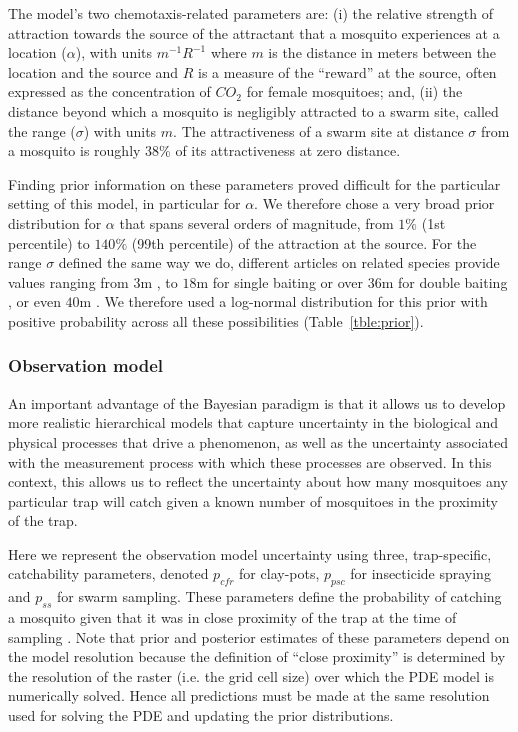 \documentclass[]{bmcart}
\newcommand{\va}{{\alpha}}
\begin{document}
The model's two chemotaxis-related parameters are: (i) the relative strength of attraction towards the source of the attractant that a mosquito experiences at a location ($\va$), with units $m^{-1} R^{-1}$ where $m$ is the distance in meters between the location and the source and $R$ is a measure of the ``reward'' at the source, often expressed as the concentration of $CO_2$ for female mosquitoes; and, (ii) the distance beyond which a mosquito is negligibly attracted to a swarm site, called the range ($\sigma$) with units $m$. The attractiveness of a swarm site at distance $\sigma$ from a mosquito is roughly 38\% of its attractiveness at zero distance.

Finding prior information on these parameters proved difficult for the particular setting of this model, in particular for $\va$. We therefore chose a very broad prior distribution for $\va$ that spans several orders of magnitude, from $1\%$ (1st percentile) to $140\%$ (99th percentile) of the attraction at the source. For the range $\sigma$ defined the same way we do, different articles on related species provide values ranging from $3$m \cite{McIver1989}, to $18$m for single baiting or over $36$m for double baiting \cite{Gillies1972}, or even $40$m \cite{Zhu2015}. We therefore used a log-normal distribution for this prior with positive probability across all these possibilities (Table~\ref{tble:prior}). 

\subsubsection{Observation model}
An important advantage of the Bayesian paradigm is that it allows us to develop more realistic hierarchical models that capture uncertainty in the biological and physical processes that drive a phenomenon, as well as the uncertainty associated with the measurement process with which these processes are observed. In this context, this allows us to reflect the uncertainty about how many mosquitoes any particular trap will catch given a known number of mosquitoes in the proximity of the trap.

Here we represent the observation model uncertainty using three, trap-specific, catchability parameters, denoted $p_{cfr}$ for clay-pots, $p_{psc}$ for insecticide spraying and $p_{ss}$ for swarm sampling. These parameters define the probability of catching a mosquito given that it was in close proximity of the trap at the time of sampling \cite{Martin2005a}. Note that prior and posterior estimates of these parameters depend on the model resolution because the definition of ``close proximity'' is determined by the resolution of the raster (i.e. the grid cell size) over which the PDE model is numerically solved. Hence all predictions must be made at the same resolution used for solving the PDE and updating the prior distributions. 
\end{document}
